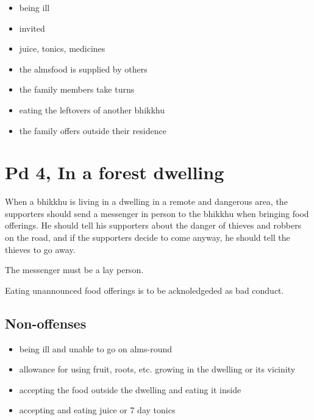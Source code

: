 \begin{multicols}{2}

\begin{itemize}
\tightlist
\item
  being ill
\item
  invited
\item
  juice, tonics, medicines
\item
  the almsfood is supplied by others
\item
  the family members take turns
\item
  eating the leftovers of another bhikkhu
\item
  the family offers outside their residence
\end{itemize}

\end{multicols}

\section{Pd 4, In a forest dwelling}

When a bhikkhu is living in a dwelling in a remote and dangerous area,
the supporters should send a messenger in person to the bhikkhu when
bringing food offerings. He should tell his supporters about the danger
of thieves and robbers on the road, and if the supporters decide to come
anyway, he should tell the thieves to go away.

The messenger must be a lay person.

Eating unannounced food offerings is to be acknoledgeded as bad conduct.

\subsection{Non-offenses}

\begin{itemize}
\tightlist
\item
  being ill and unable to go on alms-round
\item
  allowance for using fruit, roots, etc. growing in the dwelling or its
  vicinity
\item
  accepting the food outside the dwelling and eating it inside
\item
  accepting and eating juice or 7 day tonics
\end{itemize}


